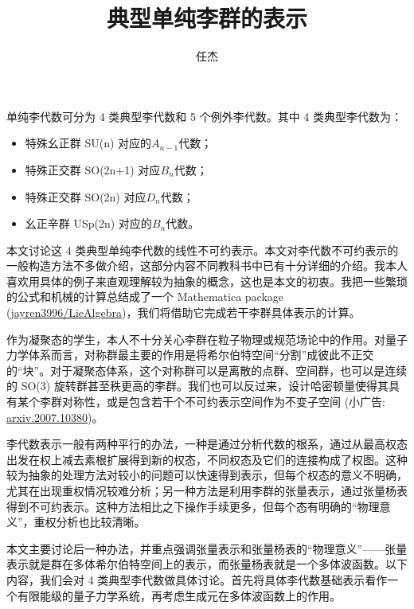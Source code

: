 \documentclass[UTF8]{ctexart}
\begin{document}
\title{典型单纯李群的表示}
\author{任杰}
\date{}

\maketitle
\noindent 单纯李代数可分为 4 类典型李代数和 5 个例外李代数。其中 4 类典型李代数为：
\begin{itemize}
	\item 特殊幺正群 SU(n) 对应的$A_{n-1}$代数；
	\item 特殊正交群 SO(2n+1) 对应$B_n$代数；
	\item 特殊正交群 SO(2n) 对应$D_n$代数；
	\item 幺正辛群 USp(2n) 对应的$B_n$代数。
\end{itemize}
本文讨论这 4 类典型单纯李代数的线性不可约表示。本文对李代数不可约表示的一般构造方法不多做介绍，这部分内容不同教科书中已有十分详细的介绍。我本人喜欢用具体的例子来直观理解较为抽象的概念，这也是本文的初衷。我把一些繁琐的公式和机械的计算总结成了一个 Mathematica package (\href{https://github.com/jayren3996/LieAlgebra}{jayren3996/LieAlgebra})，我们将借助它完成若干李群具体表示的计算。

作为凝聚态的学生，本人不十分关心李群在粒子物理或规范场论中的作用。对量子力学体系而言，对称群最主要的作用是将希尔伯特空间“分割”成彼此不正交的“块”。对于凝聚态体系，这个对称群可以是离散的点群、空间群，也可以是连续的 SO(3) 旋转群甚至秩更高的李群。我们也可以反过来，设计哈密顿量使得其具有某个李群对称性，或是包含若干个不可约表示空间作为不变子空间 (小广告: \href{https://arxiv.org/abs/2007.10380}{arxiv.2007.10380})。

李代数表示一般有两种平行的办法，一种是通过分析代数的根系，通过从最高权态出发在权上减去素根扩展得到新的权态，不同权态及它们的连接构成了权图。这种较为抽象的处理方法对较小的问题可以快速得到表示，但每个权态的意义不明确，尤其在出现重权情况较难分析；另一种方法是利用李群的张量表示，通过张量杨表得到不可约表示。这种方法相比之下操作手续更多，但每个态有明确的“物理意义”，重权分析也比较清晰。

本文主要讨论后一种办法，并重点强调张量表示和张量杨表的“物理意义”——张量表示就是群在多体希尔伯特空间上的表示，而张量杨表就是一个多体波函数。以下内容，我们会对 4 类典型李代数做具体讨论。首先将具体李代数基础表示看作一个有限能级的量子力学系统，再考虑生成元在多体波函数上的作用。
\end{document}
